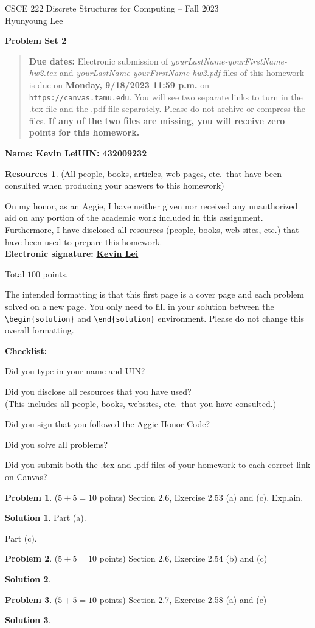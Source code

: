 \documentclass{article}
\theoremstyle{definition}
\newtheorem{problem}{Problem}
\newtheorem*{solution}{Solution}
\newtheorem*{resources}{Resources}
\newcommand{\name}[2]{\noindent\textbf{Name: #1}\hfill \textbf{UIN: #2}
  \newcommand{\myName}{#1}
  \newcommand{\myUIN}{#2}
}
\newcommand{\honor}{\noindent On my honor, as an Aggie, I have neither
  given nor received any unauthorized aid on any portion of the
  academic work included in this assignment. Furthermore, I have
  disclosed all resources (people, books, web sites, etc.) that have
  been used to prepare this homework. \\[2ex]
 \textbf{Electronic signature:} \underline{ \textbf{Kevin Lei} } } %
\newcommand{\checklist}{\noindent\textbf{Checklist:}
\begin{compactitem}[$\Box$] 
\item Did you type in your name and UIN? 
\item Did you disclose all resources that you have used? \\
(This includes all people, books, websites, etc.\ that you have consulted.)
\item Did you sign that you followed the Aggie Honor Code? 
\item Did you solve all problems? 
\item Did you submit both the .tex and .pdf files of your homework to each correct link on Canvas? 
\end{compactitem}
}
\newcommand{\problemset}[1]{\begin{center}\textbf{Problem Set #1}\end{center}}
\newcommand{\duedate}[1]{\begin{quote}\textbf{Due dates:} Electronic
    submission of \textsl{yourLastName-yourFirstName-hw2.tex} and 
    \textsl{yourLastName-yourFirstName-hw2.pdf} files of this homework is due on
    \textbf{#1} on \texttt{https://canvas.tamu.edu}. You will see two separate links
    to turn in the .tex file and the .pdf file separately. Please do not archive or compress the files.  
    \textbf{If any of the two files are missing, you will receive zero points for this homework.}\end{quote} }
\begin{document}
\begin{center}
{\large
CSCE 222 Discrete Structures for Computing -- Fall 2023\\[.5ex]
Hyunyoung Lee\\}
\end{center}
\problemset{2}
\duedate{Monday, 9/18/2023 11:59 p.m.}
\name{Kevin Lei}{432009232}  %

\begin{resources} (All people, books, articles, web pages, etc.\ that
  have been consulted when producing your answers to this homework)
\end{resources}
\honor

\bigskip

\noindent
Total $100$ points.

\bigskip

\noindent
The intended formatting is that this first page is a cover page and each 
problem solved on a new page. You only need to fill in your solution between 
the \verb|\begin{solution}| and \verb|\end{solution}| environment.  
Please do not change this overall formatting.

\vfill
\checklist

\newpage
\begin{problem} ($5+5=10$ points) Section 2.6, Exercise 2.53 (a) and (c). Explain.
\end{problem}
\begin{solution} 
Part (a).

Part (c).
\end{solution}

\newpage
\begin{problem} ($5+5=10$ points) Section 2.6, Exercise 2.54 (b) and (c)
\end{problem}
\begin{solution} 
\end{solution}

\newpage
\begin{problem} ($5+5=10$ points) Section 2.7, Exercise 2.58 (a) and (e)
\end{problem}
\begin{solution} 
\end{solution}
\end{document}
